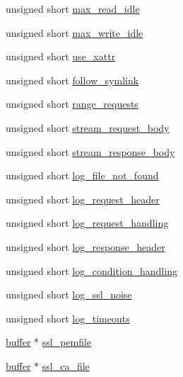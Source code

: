 \begin{DoxyCompactItemize}
\item 
unsigned short \hyperlink{structspecific__config_abae0f7b481f85bfe82a377b0950b70ca}{max\-\_\-read\-\_\-idle}
\item 
unsigned short \hyperlink{structspecific__config_afa6119faf131760f27785ff74c4af07b}{max\-\_\-write\-\_\-idle}
\item 
unsigned short \hyperlink{structspecific__config_a72e8599d7067042f7c8746c555e5cb6b}{use\-\_\-xattr}
\item 
unsigned short \hyperlink{structspecific__config_acebd4ddb29268c4a82b47c96acf23cad}{follow\-\_\-symlink}
\item 
unsigned short \hyperlink{structspecific__config_a66e2db865940e5c20d5c263718ce11d9}{range\-\_\-requests}
\item 
unsigned short \hyperlink{structspecific__config_a1a2aa3f499d362cd2c898406e9fde056}{stream\-\_\-request\-\_\-body}
\item 
unsigned short \hyperlink{structspecific__config_aaff6722b336ebe2189316f73fa8c21c4}{stream\-\_\-response\-\_\-body}
\item 
unsigned short \hyperlink{structspecific__config_a595ea0cae2257c2f62763537b1403ef7}{log\-\_\-file\-\_\-not\-\_\-found}
\item 
unsigned short \hyperlink{structspecific__config_a550854314852fe2314f42641581d9f64}{log\-\_\-request\-\_\-header}
\item 
unsigned short \hyperlink{structspecific__config_ac2386ab65ca730b15dfa3fde14093d2a}{log\-\_\-request\-\_\-handling}
\item 
unsigned short \hyperlink{structspecific__config_ae224ee9b984bacadce9ea38403f72c0f}{log\-\_\-response\-\_\-header}
\item 
unsigned short \hyperlink{structspecific__config_a9ae966c3ccc5492229e8bfe7d84994a9}{log\-\_\-condition\-\_\-handling}
\item 
unsigned short \hyperlink{structspecific__config_a4482657ba9584a181c16310786b04ff9}{log\-\_\-ssl\-\_\-noise}
\item 
unsigned short \hyperlink{structspecific__config_acb265bc71b3368a4b79d03282156c848}{log\-\_\-timeouts}
\item 
\hyperlink{structbuffer}{buffer} $\ast$ \hyperlink{structspecific__config_a9fb40263e5f01ad3f98472ffb24e8775}{ssl\-\_\-pemfile}
\item 
\hyperlink{structbuffer}{buffer} $\ast$ \hyperlink{structspecific__config_af9ab1dd5a3da47ae520fe26ea43ac36b}{ssl\-\_\-ca\-\_\-file}
\item 

\end{DoxyCompactItemize}
